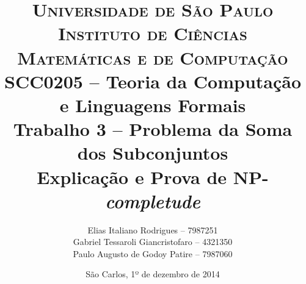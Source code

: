 \begin{titlepage}

		\title{
\textsc {\large{Universidade de São Paulo\\
Instituto de Ciências Matemáticas e de Computação}}\\[1cm]
\large{SCC0205 -- Teoria da Computação e Linguagens Formais}\\[5cm]
\LARGE{Trabalho 3 -- Problema da Soma dos Subconjuntos}\\[0.5cm]
\Large{Explicação e Prova de \textbf{NP}-\textit{completude}}\\[4cm]
		}

		\author{
Elias Italiano Rodrigues -- 7987251\\
Gabriel Tessaroli Giancristofaro -- 4321350\\
Paulo Augusto de Godoy Patire -- 7987060
		}

		\date{
\vfill São Carlos, 1º de dezembro de 2014
		}

		\maketitle
		\thispagestyle{empty}

\end{titlepage}
